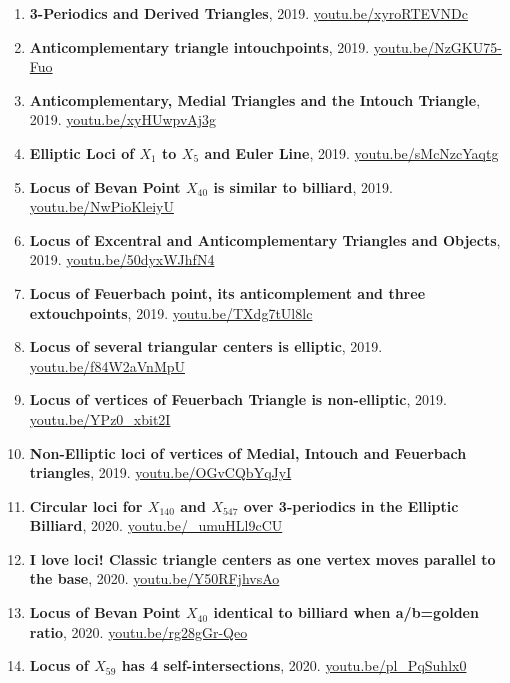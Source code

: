 \documentclass[12pt]{article}
\begin{document}
\begin{enumerate}[resume]
\item \textbf{3-Periodics and Derived Triangles}, 2019. \href{https://youtu.be/xyroRTEVNDc}{\url{youtu.be/xyroRTEVNDc}}
\item \textbf{Anticomplementary triangle intouchpoints}, 2019. \href{https://youtu.be/NzGKU75-Fuo}{\url{youtu.be/NzGKU75-Fuo}}
\item \textbf{Anticomplementary, Medial Triangles and the Intouch Triangle}, 2019. \href{https://youtu.be/xyHUwpvAj3g}{\url{youtu.be/xyHUwpvAj3g}}
\item \textbf{Elliptic Loci of $X_{1}$ to $X_{5}$ and Euler Line}, 2019. \href{https://youtu.be/sMcNzcYaqtg}{\url{youtu.be/sMcNzcYaqtg}}
\item \textbf{Locus of Bevan Point $X_{40}$ is similar to billiard}, 2019. \href{https://youtu.be/NwPioKleiyU}{\url{youtu.be/NwPioKleiyU}}
\item \textbf{Locus of Excentral and Anticomplementary Triangles and Objects}, 2019. \href{https://youtu.be/50dyxWJhfN4}{\url{youtu.be/50dyxWJhfN4}}
\item \textbf{Locus of Feuerbach point, its anticomplement and three extouchpoints}, 2019. \href{https://youtu.be/TXdg7tUl8lc}{\url{youtu.be/TXdg7tUl8lc}}
\item \textbf{Locus of several triangular centers is elliptic}, 2019. \href{https://youtu.be/f84W2aVnMpU}{\url{youtu.be/f84W2aVnMpU}}
\item \textbf{Locus of vertices of Feuerbach Triangle is non-elliptic}, 2019. \href{https://youtu.be/YPz0_xbit2I}{\url{youtu.be/YPz0\_xbit2I}}
\item \textbf{Non-Elliptic loci of vertices of Medial, Intouch and Feuerbach triangles}, 2019. \href{https://youtu.be/OGvCQbYqJyI}{\url{youtu.be/OGvCQbYqJyI}}
\item \textbf{Circular loci for $X_{140}$ and $X_{547}$ over 3-periodics in the Elliptic Billiard}, 2020. \href{https://youtu.be/_umuHLl9cCU}{\url{youtu.be/\_umuHLl9cCU}}
\item \textbf{I love loci! Classic triangle centers as one vertex moves parallel to the base}, 2020. \href{https://youtu.be/Y50RFjhvsAo}{\url{youtu.be/Y50RFjhvsAo}}
\item \textbf{Locus of Bevan Point $X_{40}$ identical to billiard when a/b=golden ratio}, 2020. \href{https://youtu.be/rg28gGr-Qeo}{\url{youtu.be/rg28gGr-Qeo}}
\item \textbf{Locus of $X_{59}$ has 4 self-intersections}, 2020. \href{https://youtu.be/pl_PqSuhlx0}{\url{youtu.be/pl\_PqSuhlx0}}

\end{enumerate}
\end{document}

